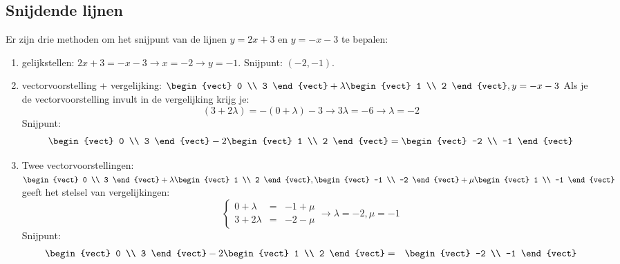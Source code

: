 \subsection{Snijdende lijnen}
Er zijn drie methoden om het snijpunt van de lijnen $y=2x+3$ en $y=-x-3$ te bepalen:
\begin{enumerate}
	\item gelijkstellen: $2x+3=-x-3 \to x=-2 \to y=-1$. Snijpunt: $(-2, -1)$.
	\item vectorvoorstelling + vergelijking: $\begin{vect} 0 \\ 3 \end{vect} + \lambda \begin{vect} 1 \\ 2 \end{vect}, y = -x -3$ Als je de vectorvoorstelling invult in de vergelijking krijg je:
	\[ (3+2 \lambda) = -(0+\lambda)-3 \to 3\lambda = -6 \to \lambda=-2 \] Snijpunt:
	\[ \begin{vect} 0 \\ 3 \end{vect} -2 \begin{vect} 1 \\ 2 \end{vect} = \begin{vect} -2 \\ -1 \end{vect} \]
	\item Twee vectorvoorstellingen: $\begin{vect} 0 \\ 3 \end{vect} + \lambda \begin{vect} 1 \\ 2 \end{vect}, \begin{vect} -1 \\ -2 \end{vect} + \mu \begin{vect} 1 \\ -1 \end{vect}$ geeft het stelsel van vergelijkingen:
	\[ \left\{ \begin{array}{lcr}
		0 + \lambda &=& -1 + \mu \\
		3 + 2\lambda &=& -2 - \mu
		\end{array}\right. \to \lambda = -2, \mu = -1 \]
	Snijpunt: \begin{eqnarray*}
		\begin{vect} 0 \\ 3 \end{vect} -2 \begin{vect} 1 \\ 2 \end{vect} &=& \begin{vect} -2 \\ -1 \end{vect} \\

\end{eqnarray*}
\end{enumerate}
